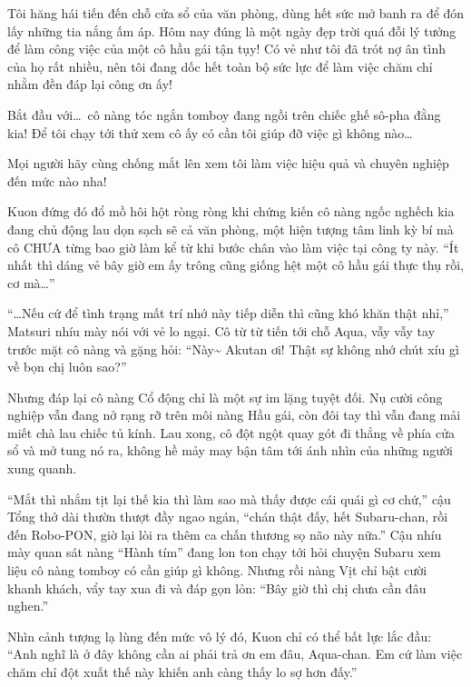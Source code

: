 \documentclass[../main.tex]{subfiles}
\begin{document}

Tôi hăng hái tiến đến chỗ cửa sổ của văn phòng, dùng hết sức mở banh ra để đón lấy những tia nắng ấm áp. Hôm nay đúng là một ngày đẹp trời quá đỗi lý tưởng để làm công việc của một cô hầu gái tận tụy! Có vẻ như tôi đã trót nợ ân tình của họ rất nhiều, nên tôi đang dốc hết toàn bộ sức lực để làm việc chăm chỉ nhằm đền đáp lại công ơn ấy!

Bắt đầu với\dots\ cô nàng tóc ngắn tomboy đang ngồi trên chiếc ghế sô-pha đằng kia! Để tôi chạy tới thử xem cô ấy có cần tôi giúp đỡ việc gì không nào\ldots

Mọi người hãy cùng chống mắt lên xem tôi làm việc hiệu quả và chuyên nghiệp đến mức nào nha!

\pov{-}

Kuon đứng đó đổ mồ hôi hột ròng ròng khi chứng kiến cô nàng ngốc nghếch kia đang chủ động lau dọn sạch sẽ cả văn phòng, một hiện tượng tâm linh kỳ bí mà cô CHƯA từng bao giờ làm kể từ khi bước chân vào làm việc tại công ty này. ``Ít nhất thì dáng vẻ bây giờ em ấy trông cũng giống hệt một cô hầu gái thực thụ rồi, cơ mà\dots''

``\dots Nếu cứ để tình trạng mất trí nhớ này tiếp diễn thì cũng khó khăn thật nhỉ,'' Matsuri nhíu mày nói với vẻ lo ngại. Cô từ từ tiến tới chỗ Aqua, vẫy vẫy tay trước mặt cô nàng và gặng hỏi: ``Này\~{} Akutan ơi! Thật sự không nhớ chút xíu gì về bọn chị luôn sao?''

Nhưng đáp lại cô nàng Cổ động chỉ là một sự im lặng tuyệt đối. Nụ cười công nghiệp vẫn đang nở rạng rỡ trên môi nàng Hầu gái, còn đôi tay thì vẫn đang mải miết chà lau chiếc tủ kính. Lau xong, cô đột ngột quay gót đi thẳng về phía cửa sổ và mở tung nó ra, không hề mảy may bận tâm tới ánh nhìn của những người xung quanh.

``Mắt thì nhắm tịt lại thế kia thì làm sao mà thấy được cái quái gì cơ chứ,'' cậu Tổng thở dài thườn thượt đầy ngao ngán, ``chán thật đấy, hết Subaru-chan, rồi đến Robo-PON, giờ lại lòi ra thêm ca chấn thương sọ não này nữa.'' Cậu nhíu mày quan sát nàng ``Hành tím'' đang lon ton chạy tới hỏi chuyện Subaru xem liệu cô nàng tomboy có cần giúp gì không. Nhưng rồi nàng Vịt chỉ bật cười khanh khách, vẩy tay xua đi và đáp gọn lỏn: ``Bây giờ thì chị chưa cần đâu nghen.''

Nhìn cảnh tượng lạ lùng đến mức vô lý đó, Kuon chỉ có thể bất lực lắc đầu: ``Anh nghĩ là ở đây không cần ai phải trả ơn em đâu, Aqua-chan. Em cứ làm việc chăm chỉ đột xuất thế này khiến anh càng thấy lo sợ hơn đấy.''
\end{document}
